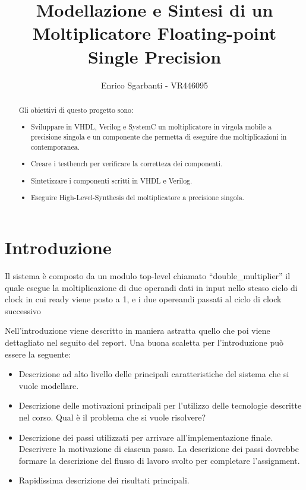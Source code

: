 \documentclass[]{IEEEtran}
\title{Modellazione e Sintesi di un Moltiplicatore Floating-point Single Precision}
\author{Enrico Sgarbanti - VR446095}
\begin{document}
\maketitle

\begin{abstract}
    Gli obiettivi di questo progetto sono:
    \begin{itemize}
        \item Sviluppare in VHDL, Verilog e SystemC un moltiplicatore in virgola mobile a precisione singola e un componente che permetta di eseguire due moltiplicazioni in contemporanea.
        \item Creare i testbench per verificare la corretteza dei componenti.
        \item Sintetizzare i componenti scritti in VHDL e Verilog.
        \item Eseguire High-Level-Synthesis del moltiplicatore a precisione singola.
    \end{itemize}
\end{abstract}


\section{Introduzione}
Il sistema è composto da un modulo top-level chiamato ``double\_multiplier'' il quale esegue la moltiplicazione di due operandi dati in input nello stesso ciclo di clock in cui ready viene posto a 1, e i due opereandi passati al ciclo di clock successivo

Nell'introduzione viene descritto in maniera astratta quello che poi viene dettagliato nel seguito del report. Una buona scaletta per l'introduzione può essere la seguente:
\begin{itemize}
\item Descrizione ad alto livello delle principali caratteristiche del sistema che si vuole modellare.
\item Descrizione delle motivazioni principali per l'utilizzo delle tecnologie descritte nel corso. Qual è il problema che si vuole risolvere?
\item Descrizione dei passi utilizzati per arrivare all'implementazione finale. Descrivere la motivazione di ciascun passo. La descrizione dei passi dovrebbe formare la descrizione del flusso di lavoro svolto per completare l'assignment.
\item Rapidissima descrizione dei risultati principali.
\end{itemize}
\end{document}
